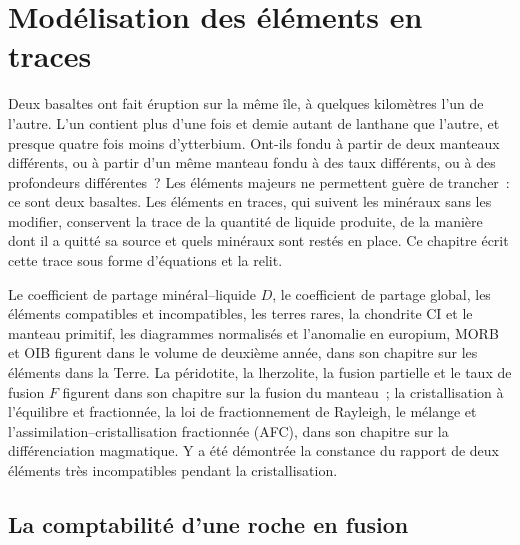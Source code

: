 \chapter{Modélisation des éléments en traces}\label{ch:b3:trace-element-modelling}

Deux basaltes ont fait éruption sur la même île, à quelques kilomètres l'un de l'autre. L'un
contient plus d'une fois et demie autant de lanthane que l'autre, et presque quatre fois
moins d'ytterbium. Ont-ils fondu à partir de deux manteaux différents, ou à partir d'un même manteau
fondu à des taux différents, ou à des profondeurs différentes~? Les éléments majeurs
ne permettent guère de trancher~: ce sont deux basaltes. Les éléments en traces, qui suivent les minéraux
sans les modifier, conservent la trace de la quantité de liquide produite, de la manière dont il a quitté
sa source et quels minéraux sont restés en place. Ce chapitre écrit cette trace
sous forme d'équations et la relit.

\begin{recall}
Le coefficient de partage minéral--liquide $D$, le coefficient de partage global,
les éléments compatibles et incompatibles, les terres rares, la chondrite CI
et le manteau primitif, les diagrammes normalisés et l'anomalie en
europium, MORB et OIB figurent dans le volume de deuxième année, dans son chapitre sur les éléments dans la Terre.
La péridotite, la lherzolite, la fusion partielle et le taux de fusion $F$
figurent dans son chapitre sur la fusion du manteau~; la cristallisation à l'équilibre et
fractionnée, la loi de fractionnement de Rayleigh, le mélange et
l'assimilation--cristallisation fractionnée (AFC), dans son chapitre sur la
différenciation magmatique. Y a été démontrée la constance du rapport de deux éléments très
incompatibles pendant la cristallisation.
\end{recall}

\section{La comptabilité d'une roche en fusion}\label{sec:b3:trace-element-modelling:balance}

